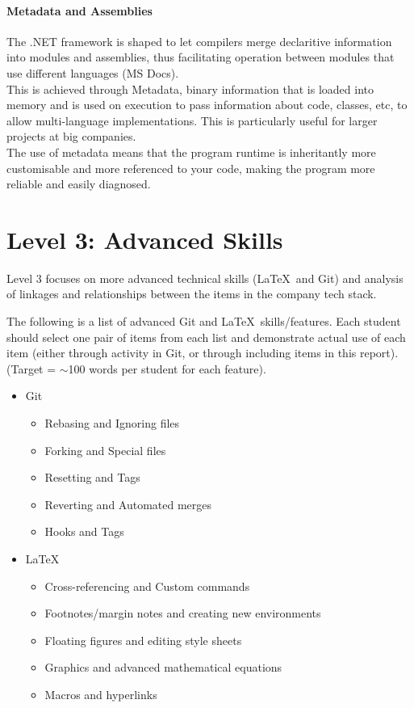 \documentclass[a4paper, 11pt]{report}
\begin{document}
	\paragraph{Metadata and Assemblies} The .NET framework is shaped to let compilers merge declaritive information into modules and assemblies, thus facilitating operation between modules that use different languages (MS Docs). 
	\\This is achieved through Metadata, binary information that is loaded into memory and is used on execution to pass information about code, classes, etc, to allow multi-language implementations. This is particularly useful for larger projects at big companies. 
	\\The use of metadata means that the program runtime is inheritantly more customisable and more referenced to your code, making the program more reliable and easily diagnosed.
	
	
	
	\newpage
	\section{Level 3: Advanced Skills}
	
	Level 3 focuses on more advanced technical skills (\LaTeX\ and Git) and analysis of linkages and relationships between the items in the company tech stack.
	
	The following is a list of advanced Git and \LaTeX\ skills/features. Each student should select one pair of items from each list and demonstrate actual use of each item (either through activity in Git, or through including items in this report). (Target = $\sim$100 words per student for each feature).
	\begin{itemize}
		\item Git
		\begin{itemize}
			\item Rebasing and Ignoring files
			\item Forking and Special files
			\item Resetting and Tags
			\item Reverting and Automated merges
			\item Hooks and Tags
		\end{itemize}
		\item \LaTeX\ 
		\begin{itemize}
			\item Cross-referencing and Custom commands
			\item Footnotes/margin notes and creating new environments
			\item Floating figures and editing style sheets
			\item Graphics and advanced mathematical equations
			\item Macros and hyperlinks
		\end{itemize}
	\end{itemize}
	
\end{document}

